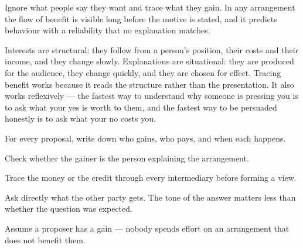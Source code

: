 


\begin{core}
Ignore what people say they want and trace what they gain. In any arrangement the flow of benefit is visible long before the motive is stated, and it predicts behaviour with a reliability that no explanation matches.
\end{core}

\begin{mechanism}
Interests are structural: they follow from a person's position, their costs and their income, and they change slowly. Explanations are situational: they are produced for the audience, they change quickly, and they are chosen for effect. Tracing benefit works because it reads the structure rather than the presentation. It also works reflexively --- the fastest way to understand why someone is pressing you is to ask what your yes is worth to them, and the fastest way to be persuaded honestly is to ask what your no costs you.
\end{mechanism}

\begin{application}
  \item For every proposal, write down who gains, who pays, and when each happens.
  \item Check whether the gainer is the person explaining the arrangement.
  \item Trace the money or the credit through every intermediary before forming a view.
  \item Ask directly what the other party gets. The tone of the answer matters less than whether the question was expected.
  \item Assume a proposer has a gain --- nobody spends effort on an arrangement that does not benefit them.
\end{application}

